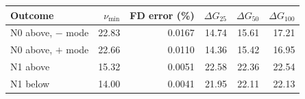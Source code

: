 \begin{tabular}{lrrrrr}\toprule
Outcome & $\nu_{\min}$ & FD error (\%) & $\Delta G_{25}$ & $\Delta G_{50}$ & $\Delta G_{100}$\\\midrule
N0 above, $-$ mode & 22.83 & 0.0167 & 14.74 & 15.61 & 17.21\\
N0 above, $+$ mode & 22.66 & 0.0110 & 14.36 & 15.42 & 16.95\\
N1 above & 15.32 & 0.0051 & 22.58 & 22.36 & 22.54\\
N1 below & 14.00 & 0.0041 & 21.95 & 22.11 & 22.13\\
\bottomrule\end{tabular}
